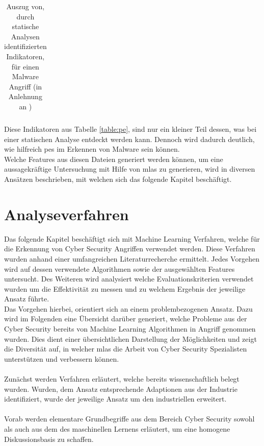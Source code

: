 \documentclass[
    12pt, %
    DIV10,
    ngerman, %
    a4paper, %
    oneside, %
    titlepage, %
    parskip=half, %
    headings=normal, %
    listof=totoc, %
    bibliography=totoc, %
    index=totoc, %
    captions=tableheading, %
    final %
]{scrreprt}
\begin{document}
\begin{table}[H]
\begin{tabular}{lll}
\end{tabular}
\caption{Auszug von, durch statische Analysen identifizierten Indikatoren, für einen Malware Angriff (in Anlehnung an \textcite{Sikorski2012})}\label{table:pe}
Diese Indikatoren aus Tabelle \ref{table:pe}, sind nur ein kleiner Teil dessen, was bei einer statischen Analyse entdeckt werden kann. Dennoch wird dadurch deutlich, wie hilfreich \ac{pes} im Erkennen von Malware sein können.\\ 
Welche Features aus diesen Dateien generiert werden können, um eine aussagekräftige Untersuchung mit Hilfe von \ac{mlas} zu generieren, wird in diversen Ansätzen beschrieben, mit welchen sich das folgende Kapitel beschäftigt.
\label{tab:iocs}
\end{table}
\chapter{Analyseverfahren}\label{sec:analyse}
\label{sec:ba}
Das folgende Kapitel beschäftigt sich mit Machine Learning Verfahren, welche für die Erkennung von Cyber Security Angriffen verwendet werden. Diese Verfahren wurden anhand einer umfangreichen Literaturrecherche ermittelt. Jedes Vorgehen wird auf dessen verwendete Algorithmen sowie der ausgewählten Features untersucht. Des Weiteren wird analysiert welche Evaluationskriterien verwendet wurden um die Effektivität zu messen und zu welchem Ergebnis der jeweilige Ansatz führte.\\
Das Vorgehen hierbei, orientiert sich an einem problembezogenen Ansatz. Dazu wird im Folgenden eine Übersicht darüber generiert, welche Probleme aus der Cyber Security bereits von Machine Learning Algorithmen in Angriff genommen wurden. Dies dient einer übersichtlichen Darstellung der Möglichkeiten und zeigt die Diversität auf, in welcher \ac{mlas} die Arbeit von Cyber Security Spezialisten unterstützen und verbessern können.\\\\
Zunächst werden Verfahren erläutert, welche bereits wissenschaftlich belegt wurden. Wurden, dem Ansatz entsprechende Adaptionen aus der Industrie identifiziert, wurde der jeweilige Ansatz um den industriellen erweitert.
\\\\
Vorab werden elementare Grundbegriffe aus dem Bereich Cyber Security sowohl als auch aus dem des maschinellen Lernens erläutert, um eine homogene Diskussionsbasis zu schaffen.
\end{document}
